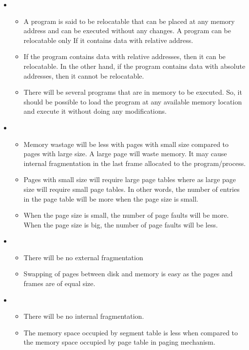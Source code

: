 \begin{itemize}
    \item 
        \begin{itemize}
            \item A program is said to be relocatable that can be placed at any memory address and can be executed without any changes. A program can be relocatable only If it contains data with relative address.
            \item If the program contains data with relative addresses, then it can be relocatable. In the other hand, if the program contains data with absolute addresses, then it cannot be relocatable.
            \item There will be several programs that are in memory to be executed. So, it should be possible to load the program at any available memory location and execute it without doing any modifications.
        \end{itemize}
    \item
        \begin{itemize}
            \item Memory wastage will be less with pages with small size compared to pages with large size. A large page will waste memory. It may cause internal fragmentation in the last frame allocated to the program/process.
            \item Pages with small size will require large page tables where as large page size will require small page tables. In other words, the number of entries in the page table will be more when the page size is small.
            \item When the page size is small, the number of page faults will be more. When the page size is big, the number of page faults will be less.
        \end{itemize}
    \item 
        \begin{itemize}
            \item There will be no external fragmentation
            \item Swapping of pages between disk and memory is easy as the pages and frames are of equal size.
        \end{itemize}
    \item 
        \begin{itemize}
            \item There will be no internal fragmentation.
            \item The memory space occupied by segment table is less when compared to the memory space occupied by page table in paging mechanism.
        \end{itemize}
\end{itemize}

